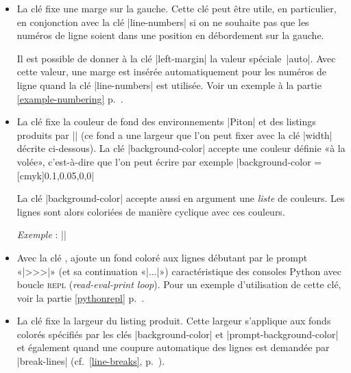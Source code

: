 \documentclass[dvipsnames,svgnames]{article}
\begin{document}
\begin{itemize}
Pour la commmodité, un dispositif de factorisation du préfixe |line-numbers| est disponible, c'est-à-dire que l'on
peut écrire :

\begin{Verbatim}
\PitonOptions
  {
    line-numbers = 
      { 
        skip-empty-lines = false ,
        label-empty-lines = false ,
        sep = 1 em
      }
  }
\end{Verbatim}


\item {} La clé  fixe une marge sur la gauche. Cette clé peut être utile, en particulier, en
conjonction avec la clé |line-numbers| si on ne souhaite pas que les numéros de ligne soient dans une position en
débordement sur la gauche.

Il est possible de donner à la clé |left-margin| la valeur spéciale~|auto|. Avec cette valeur, une marge est
insérée automatiquement pour les numéros de ligne quand la clé |line-numbers| est utilisée. Voir un exemple à la
partie \ref{example-numbering} p.~\pageref{example-numbering}.

\item {} La clé  fixe la couleur de fond des environnements |{Piton}| et des listings
produits par |\PitonInputFile| (ce fond a une largeur que l'on peut fixer avec la clé |width| décrite ci-dessous).
La clé |background-color| accepte une couleur définie «à la volée», c'est-à-dire que l'on peut écrire par exemple
|background-color = [cmyk]{0.1,0.05,0,0}|

\smallskip
La clé |background-color| accepte aussi en argument une \emph{liste} de couleurs. Les lignes sont alors coloriées
de manière cyclique avec ces couleurs.

\emph{Exemple} : ||

\item {} Avec la clé ,  ajoute un fond coloré aux lignes débutant par
le prompt «|>>>|» (et sa continuation «|...|») caractéristique des consoles Python avec boucle \textsc{repl}
(\emph{read-eval-print loop}). Pour un exemple d'utilisation de cette clé, voir la partie \ref{pythonrepl}
p.~\pageref{pythonrepl}.

\item {} La clé  fixe la largeur du listing produit. Cette largeur s'applique aux fonds colorés
spécifiés par les clés |background-color| et |prompt-background-color| et également quand une coupure automatique
des lignes est demandée par |break-lines| (cf.~\ref{line-breaks}, p.~\pageref{line-breaks}).


\end{itemize}
\end{document}
